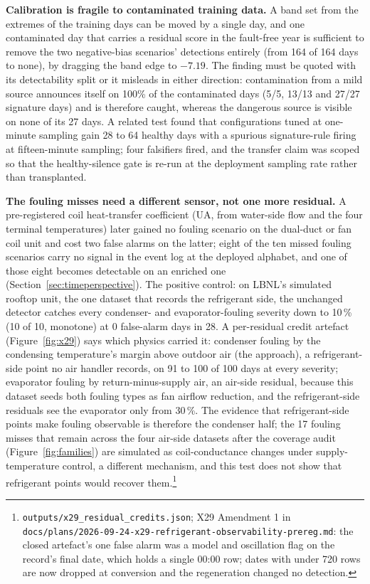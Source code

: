 \documentclass[11pt,letterpaper]{article}
\begin{document}
\textbf{Calibration is fragile to contaminated training data.} A band set from the extremes of the training days can be moved by a single day, and one contaminated day that carries a residual score in the fault-free year is sufficient to remove the two negative-bias scenarios' detections entirely (from 164 of 164 days to none), by dragging the band edge to $-7.19$. The finding must be quoted with its detectability split or it misleads in either direction: contamination from a mild source announces itself on 100\% of the contaminated days (5/5, 13/13 and 27/27 signature days) and is therefore caught, whereas the dangerous source is visible on none of its 27 days. A related test found that configurations tuned at one-minute sampling gain 28 to 64 healthy days with a spurious signature-rule firing at fifteen-minute sampling; four falsifiers fired, and the transfer claim was scoped so that the healthy-silence gate is re-run at the deployment sampling rate rather than transplanted.

\textbf{The fouling misses need a different sensor, not one more residual.} A pre-registered coil heat-transfer coefficient (UA, from water-side flow and the four terminal temperatures) later gained no fouling scenario on the dual-duct or fan coil unit and cost two false alarms on the latter; eight of the ten missed fouling scenarios carry no signal in the event log at the deployed alphabet, and one of those eight becomes detectable on an enriched one (Section~\ref{sec:timeperspective}). The positive control: on LBNL's simulated rooftop unit, the one dataset that records the refrigerant side, the unchanged detector catches every condenser- and evaporator-fouling severity down to 10\,\% (10 of 10, monotone) at 0 false-alarm days in 28. A per-residual credit artefact (Figure~\ref{fig:x29}) says which physics carried it: condenser fouling by the condensing temperature's margin above outdoor air (the approach), a refrigerant-side point no air handler records, on 91 to 100 of 100 days at every severity; evaporator fouling by return-minus-supply air, an air-side residual, because this dataset seeds both fouling types as fan airflow reduction, and the refrigerant-side residuals see the evaporator only from 30\,\%. The evidence that refrigerant-side points make fouling observable is therefore the condenser half; the 17 fouling misses that remain across the four air-side datasets after the coverage audit (Figure~\ref{fig:families}) are simulated as coil-conductance changes under supply-temperature control, a different mechanism, and this test does not show that refrigerant points would recover them.\footnote{\texttt{outputs/x29\_residual\_credits.json}; X29 Amendment 1 in \texttt{docs/plans/2026-09-24-x29-refrigerant-observability-prereg.md}: the closed artefact's one false alarm was a model and oscillation flag on the record's final date, which holds a single 00:00 row; dates with under 720 rows are now dropped at conversion and the regeneration changed no detection.}
\end{document}
